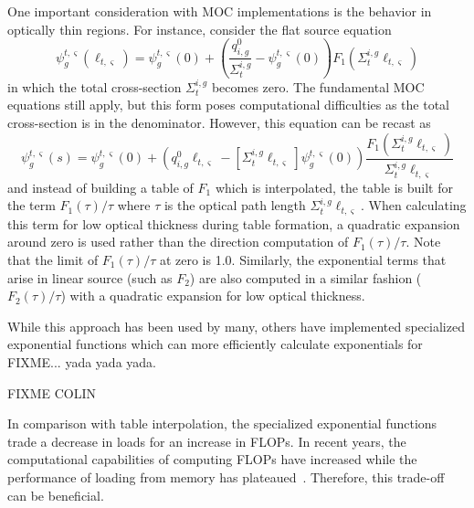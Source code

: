 One important consideration with \ac{MOC} implementations is the behavior in optically thin regions. For instance, consider the flat source equation
\begin{equation*}
	\psi_g^{t,\varsigma}(\ell_{t,\varsigma}) = \psi^{t,\varsigma}_g(0) + \left( \frac{q^0_{i,g}}{\Sigma_{t}^{i,g}} - \psi_g^{t,\varsigma}(0) \right) F_1\left(\Sigma_{t}^{i,g} \ell_{t,\varsigma} \right)
\end{equation*}
in which the total cross-section $\Sigma_{t}^{i,g}$ becomes zero. The fundamental \ac{MOC} equations still apply, but this form poses computational difficulties as the total cross-section is in the denominator. However, this equation can be recast as
\begin{equation}
	\psi_g^{t,\varsigma}(s) = \psi^{t,\varsigma}_g(0) + \left(q^0_{i,g} \ell_{t,\varsigma} - \left[\Sigma_{t}^{i,g} \ell_{t,\varsigma}\right]\psi_g^{t,\varsigma}(0) \right) \frac{F_1\left(\Sigma_{t}^{i,g} \ell_{t,\varsigma} \right)}{\Sigma_{t}^{i,g} \ell_{t,\varsigma}}
\end{equation}
and instead of building a table of $F_1$ which is interpolated, the table is built for the term $F_1(\tau) / \tau$ where $\tau$ is the optical path length $\Sigma_{t}^{i,g} \ell_{t,\varsigma}$. When calculating this term for low optical thickness during table formation, a quadratic expansion around zero is used rather than the direction computation of $F_1(\tau) / \tau$. Note that the limit of $F_1(\tau) / \tau$ at zero is 1.0. Similarly, the exponential terms that arise in linear source (such as $F_2$) are also computed in a similar fashion ($F_2(\tau) / \tau$) with a quadratic expansion for low optical thickness.

While this approach has been used by many, others have implemented specialized exponential functions which can more efficiently calculate exponentials for FIXME... yada yada yada. 

FIXME COLIN

In comparison with table interpolation, the specialized exponential functions trade a decrease in loads for an increase in \acp{FLOP}. In recent years, the computational capabilities of computing \acp{FLOP} have increased while the performance of loading from memory has plateaued~\cite{Patterson_1997}. Therefore, this trade-off can be beneficial.

